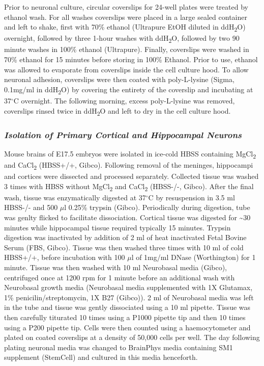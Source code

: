 \documentclass[onehalf,12pt]{beavtex}
\begin{document}
  Prior to neuronal culture, circular coverslips for 24-well plates were
  treated by ethanol wash. For all washes coverslips were placed in a
  large sealed container and left to shake, first with 70\% ethanol
  (Ultrapure EtOH diluted in ddH\textsubscript{2}O) overnight, followed by
  three 1-hour washes with ddH\textsubscript{2}O, followed by two 90
  minute washes in 100\% ethanol (Ultrapure). Finally, coverslips were
  washed in 70\% ethanol for 15 minutes before storing in 100\% Ethanol.
  Prior to use, ethanol was allowed to evaporate from coverslips inside
  the cell culture hood. To allow neuronal adhesion, coverslips were then
  coated with poly-L-lysine (Sigma, 0.1mg/ml in ddH\textsubscript{2}O) by
  covering the entirety of the coverslip and incubating at 37\(^\circ\)C
  overnight. The following morning, excess poly-L-lysine was removed,
  coverslips rinsed twice in ddH\textsubscript{2}O and left to dry in the
  cell culture hood.
  
  \subsubsection*{\texorpdfstring{\emph{Isolation of Primary Cortical and
  Hippocampal
  Neurons}}{Isolation of Primary Cortical and Hippocampal Neurons}}\label{isolation-of-primary-cortical-and-hippocampal-neurons}
  
  Mouse brains of E17.5 embryos were isolated in ice-cold HBSS containing
  MgCl\textsubscript{2} and CaCl\textsubscript{2} (HBSS+/+, Gibco).
  Following removal of the meninges, hippocampi and cortices were
  dissected and processed separately. Collected tissue was washed 3 times
  with HBSS without MgCl\textsubscript{2} and CaCl\textsubscript{2}
  (HBSS-/-, Gibco). After the final wash, tissue was enzymatically
  digested at 37\(^\circ\)C by resuspension in 3.5 ml HBSS-/- and 500
  \(\mu\)l 0.25\% trypsin (Gibco). Periodically during digestion, tube was
  genlty flicked to facilitate dissociation. Cortical tissue was digested
  for \textasciitilde{}30 minutes while hippocampal tissue required
  typically 15 minutes. Trypsin digestion was inactivated by addition of 2
  ml of heat inactivated Fetal Bovine Serum (FBS, Gibco). Tissue was then
  washed three times with 10 ml of cold HBSS+/+, before incubation with
  100 \(\mu\)l of 1mg/ml DNase (Worthington) for 1 minute. Tissue was then
  washed with 10 ml Neurobasal media (Gibco), centrifuged once at 1200 rpm
  for 1 minute before an additional wash with Neurobasal growth media
  (Neurobasal media supplemented with 1X Glutamax, 1\%
  penicilin/streptomycin, 1X B27 (Gibco)). 2 ml of Neurobasal media was
  left in the tube and tissue was gently dissociated using a 10 ml
  pipette. Tissue was then carefully titurated 10 times using a P1000
  pipette tip and then 10 times using a P200 pipette tip. Cells were then
  counted using a haemocytometer and plated on coated coverslips at a
  density of 50,000 cells per well. The day following plating neuronal
  media was changed to BrainPhys media containing SM1 supplement
  (StemCell) and cultured in this media henceforth.
  
\end{document}
